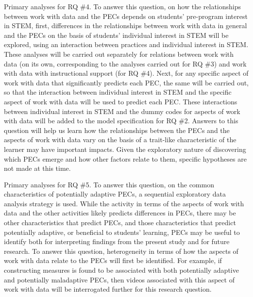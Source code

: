 \documentclass[]{book}
\theoremstyle{definition}
\theoremstyle{definition}
\theoremstyle{definition}
\theoremstyle{remark}
\begin{document}
Primary analyses for RQ \#4. To answer this question, on how the
relationships between work with data and the PECs depends on students'
pre-program interest in STEM, first, differences in the relationships
between work with data in general and the PECs on the basis of students'
individual interest in STEM will be explored, using an interaction
between practices and individual interest in STEM. These analyses will
be carried out separately for relations between work with data (on its
own, corresponding to the analyses carried out for RQ \#3) and work with
data with instructional support (for RQ \#4). Next, for any specific
aspect of work with data that significantly predicts each PEC, the same
will be carried out, so that the interaction between individual interest
in STEM and the specific aspect of work with data will be used to
predict each PEC. These interactions between individual interest in STEM
and the dummy codes for aspects of work with data will be added to the
model specification for RQ \#2. Answers to this question will help us
learn how the relationships between the PECs and the aspects of work
with data vary on the basis of a trait-like characteristic of the
learner may have important impacts. Given the exploratory nature of
discovering which PECs emerge and how other factors relate to them,
specific hypotheses are not made at this time.

Primary analyses for RQ \#5. To answer this question, on the common
characteristics of potentially adaptive PECs, a sequential exploratory
data analysis strategy is used. While the activity in terms of the
aspects of work with data and the other activities likely predicts
differences in PECs, there may be other characteristics that predict
PECs, and those characteristics that predict potentially adaptive, or
beneficial to students' learning, PECs may be useful to identify both
for interpreting findings from the present study and for future
research. To answer this question, heterogeneity in terms of how the
aspects of work with data relate to the PECs will first be identified.
For example, if constructing measures is found to be associated with
both potentially adaptive and potentially maladaptive PECs, then videos
associated with this aspect of work with data will be interrogated
further for this research question.
\end{document}

